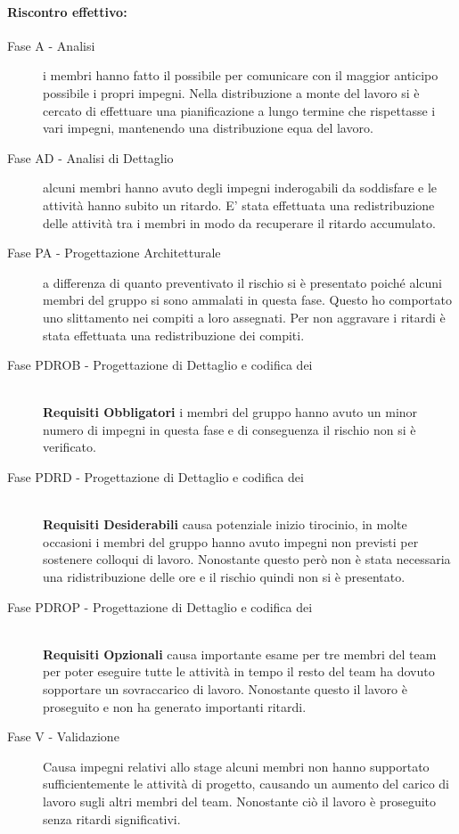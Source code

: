\documentclass[../PianoProgetto.tex]{subfiles}
\begin{document}
	\paragraph*{Riscontro effettivo:}
		\begin{description}
			\item[Fase A - Analisi] i membri hanno fatto il possibile per comunicare con il maggior anticipo possibile i propri impegni. Nella distribuzione a monte del lavoro si è cercato di effettuare una pianificazione a lungo termine che rispettasse i vari impegni, mantenendo una distribuzione equa del lavoro.
			\item[Fase AD - Analisi di Dettaglio] alcuni membri hanno avuto degli impegni inderogabili da soddisfare e le attività hanno subito un ritardo. E' stata effettuata una redistribuzione delle attività tra i membri in modo da recuperare il ritardo accumulato. 
			\item[Fase PA - Progettazione Architetturale] a differenza  di quanto preventivato il rischio si è presentato poiché alcuni membri del gruppo si sono ammalati in questa fase. Questo ho comportato uno slittamento nei compiti a loro assegnati. Per non aggravare i ritardi è stata effettuata una redistribuzione dei compiti.
			\item[Fase PDROB - Progettazione di Dettaglio e codifica dei]  \ \\
					\textbf{Requisiti Obbligatori} i membri del gruppo hanno avuto un minor numero di impegni in questa fase e di conseguenza il rischio non si è verificato.
			\item[Fase PDRD - Progettazione di Dettaglio e codifica dei] \ \\
					\textbf{Requisiti Desiderabili} causa potenziale inizio tirocinio, in molte occasioni i membri del gruppo hanno avuto impegni non previsti per sostenere colloqui di lavoro. Nonostante questo però non è stata necessaria una ridistribuzione delle ore e il rischio quindi non si è presentato.
			\item[Fase PDROP - Progettazione di Dettaglio e codifica dei]  \ \\
					\textbf{Requisiti Opzionali} causa importante esame per tre membri del team per poter eseguire tutte le attività in tempo il resto del team ha dovuto sopportare un sovraccarico di lavoro. Nonostante questo il lavoro è proseguito e non ha generato importanti ritardi.
			\item[Fase V - Validazione] Causa impegni relativi allo stage alcuni membri non hanno 			supportato sufficientemente le attività di progetto, causando un aumento del 			carico di lavoro sugli altri membri del team. Nonostante ciò il lavoro è 				proseguito senza ritardi significativi. 
		\end{description}
	
\end{document}
